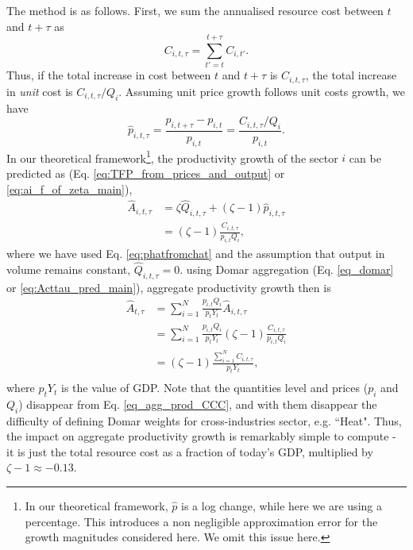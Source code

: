 The method is as follows. First, we sum the annualised resource cost between $t$ and $t+\tau$ as 
\begin{equation} C_{i,t,\tau}=\sum_{t'=t}^{t+\tau}C_{i,t'}.
\end{equation}
Thus, if the total increase in cost between $t$ and $t+\tau$ is $C_{i,t,\tau}$, the total increase in \textit{unit} cost is $C_{i,t,\tau}/Q_i$. Assuming unit price growth follows unit costs growth, we have
\begin{equation}
    \hat{p}_{i,t,\tau}=\frac{p_{i,t+\tau}-p_{i,t}}{p_{i,t}}=\frac{C_{i,t,\tau}/Q_i}{p_{i,t}}.
    \label{eq:phatfromchat}
\end{equation}
In our theoretical framework\footnote{
%
In our theoretical framework, $\hat{p}$ is a log change, while here we are using a percentage. This introduces a non negligible approximation error for the growth magnitudes considered here. We omit this issue here.
%
}, the productivity growth of the sector $i$ can be predicted as (Eq. \ref{eq:TFP_from_prices_and_output} or
\ref{eq:ai_f_of_zeta_main}),
\begin{equation}
\begin{aligned}
    \hat{A}_{i,t,\tau}&=\zeta \hat{Q}_{i,t,\tau}+(\zeta-1) \hat{p}_{i,t,\tau}\\
    &=(\zeta-1) \frac{C_{i,t,\tau}}{p_{i,t}Q_i},
    \end{aligned}
\end{equation}
where we have used Eq. \ref{eq:phatfromchat} and the assumption that output in volume remains constant, $\hat{Q}_{i,t,\tau}=0$.
using Domar aggregation (Eq. \ref{eq_domar} or \ref{eq:Acttau_pred_main}), aggregate productivity growth then is 
\begin{equation}
\label{eq_agg_prod_CCC}
\begin{aligned}
    \hat{A}_{t,\tau}&=\sum_{i=1}^N \frac{p_{i,t}Q_i}{p_{t}Y_t} \hat{A}_{i,t,\tau}\\
    &=\sum_{i=1}^N \frac{p_{i,t}Q_i}{p_{t}Y_t}(\zeta-1) \frac{C_{i,t,\tau}}{p_{i,t}Q_i}\\
      &= (\zeta-1) \frac{\sum_{i=1}^N C_{i,t,\tau}}{p_{t}Y_t},\\
\end{aligned}
\end{equation}
where $p_{t}Y_t$ is the value of GDP. Note that the quantities level and prices ($p_i$ and $Q_i$) disappear from Eq. \ref{eq_agg_prod_CCC}, and with them disappear the difficulty of defining Domar weights for cross-industries sector, e.g. ``Heat". Thus, the impact on aggregate productivity growth is remarkably simple to compute - it is just the total resource cost as a fraction of today's GDP, multiplied by $\zeta-1 \approx -0.13$. 

